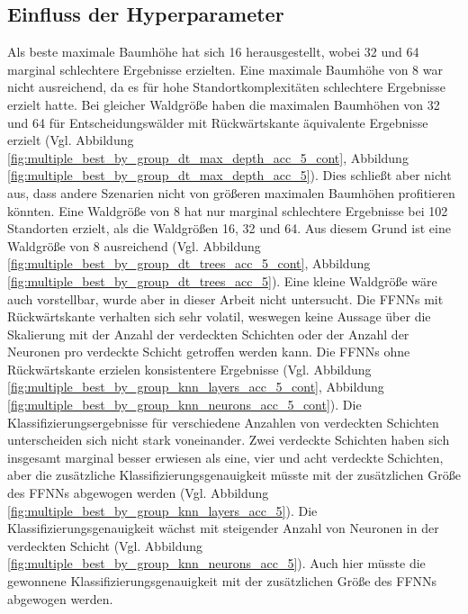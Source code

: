 \subsection{Einfluss der Hyperparameter}
Als beste maximale Baumhöhe hat sich 16 herausgestellt, wobei 32 und 64 marginal schlechtere Ergebnisse erzielten.
Eine maximale Baumhöhe von 8 war nicht ausreichend, da es für hohe Standortkomplexitäten schlechtere Ergebnisse erzielt hatte.
Bei gleicher Waldgröße haben die maximalen Baumhöhen von 32 und 64 für Entscheidungswälder mit Rückwärtskante äquivalente
Ergebnisse erzielt (Vgl. Abbildung \ref{fig:multiple_best_by_group_dt_max_depth_acc_5_cont}, Abbildung \ref{fig:multiple_best_by_group_dt_max_depth_acc_5}).
Dies schließt aber nicht aus, dass andere Szenarien nicht von größeren maximalen Baumhöhen profitieren könnten.
\newline
\newline
Eine Waldgröße von 8 hat nur marginal schlechtere Ergebnisse bei 102 Standorten erzielt, als die Waldgrößen 16, 32 und 64.
Aus diesem Grund ist eine Waldgröße von 8 ausreichend (Vgl. Abbildung \ref{fig:multiple_best_by_group_dt_trees_acc_5_cont}, Abbildung \ref{fig:multiple_best_by_group_dt_trees_acc_5}).
Eine kleine Waldgröße wäre auch vorstellbar, wurde aber in dieser Arbeit nicht untersucht.
\newline
\newline
Die FFNNs mit Rückwärtskante verhalten sich sehr volatil, weswegen keine Aussage über die Skalierung mit der
Anzahl der verdeckten Schichten oder der Anzahl der Neuronen pro verdeckte Schicht getroffen werden kann.
Die FFNNs ohne Rückwärtskante erzielen konsistentere Ergebnisse (Vgl. Abbildung \ref{fig:multiple_best_by_group_knn_layers_acc_5_cont}, Abbildung \ref{fig:multiple_best_by_group_knn_neurons_acc_5_cont}).
Die Klassifizierungsergebnisse für verschiedene Anzahlen von verdeckten Schichten unterscheiden sich nicht stark voneinander.
Zwei verdeckte Schichten haben sich insgesamt marginal besser erwiesen als eine, vier und acht verdeckte Schichten,
aber die zusätzliche Klassifizierungsgenauigkeit müsste mit der zusätzlichen Größe des FFNNs abgewogen werden (Vgl. Abbildung \ref{fig:multiple_best_by_group_knn_layers_acc_5}).
Die Klassifizierungsgenauigkeit wächst mit steigender Anzahl von Neuronen in der verdeckten Schicht (Vgl. Abbildung \ref{fig:multiple_best_by_group_knn_neurons_acc_5}).
Auch hier müsste die gewonnene Klassifizierungsgenauigkeit mit der zusätzlichen Größe des FFNNs abgewogen werden.
